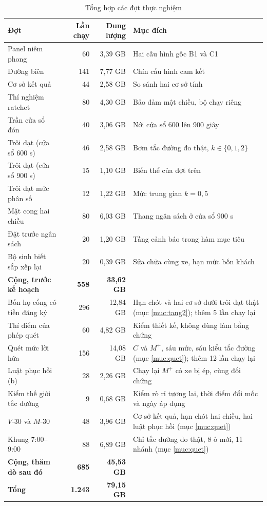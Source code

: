 \begin{table}[htbp]
\centering
\caption{Tổng hợp các đợt thực nghiệm}
\label{bang:quymo}
\small
\begin{tabular}{@{}lrrp{5.6cm}@{}}
\toprule
\textbf{Đợt} & \textbf{Lần chạy} & \textbf{Dung lượng} & \textbf{Mục đích}\\
\midrule
Panel niêm phong & 60 & 3{,}39 GB & Hai cấu hình gốc B1 và C1\\
Đường biên & 141 & 7{,}77 GB & Chín cấu hình cam kết\\
Cơ sở kết quả & 44 & 2{,}58 GB & So sánh hai cơ sở tính\\
Thí nghiệm ratchet & 80 & 4{,}30 GB & Bảo đảm một chiều, bộ chạy riêng\\
Trần cửa sổ đón & 40 & 3{,}06 GB & Nới cửa sổ 600 lên 900 giây\\
Trôi dạt (cửa sổ 600 s) & 46 & 2{,}58 GB & Bơm tắc đường đo thật, $k \in \{0,1,2\}$\\
Trôi dạt (cửa sổ 900 s) & 15 & 1{,}10 GB & Biến thể của đợt trên\\
Trôi dạt mức phân số & 12 & 1{,}22 GB & Mức trung gian $k = 0{,}5$\\
Mặt cong hai chiều & 80 & 6{,}03 GB & Thang ngân sách ở cửa sổ 900 s\\
Đặt trước ngân sách & 20 & 1{,}20 GB & Tầng cảnh báo trong hàm mục tiêu\\
Bộ sinh biết sắp xếp lại & 20 & 0{,}39 GB & Sửa chữa cùng xe, hạn mức bốn khách\\
\midrule
\textbf{Cộng, trước kế hoạch} & \textbf{558} & \textbf{33{,}62 GB} & \\
\midrule
Bốn họ cổng có tiền đăng ký & 296 & 12{,}84 GB & Hạn chót và hai cơ sở dưới trôi dạt thật (mục \ref{muc:tang2}); thêm 5 lần chạy lại\\
Thí điểm của phép quét & 60 & 4{,}82 GB & Kiểm thiết kế, không dùng làm bằng chứng\\
Quét mức lời hứa & 156 & 14{,}08 GB & $C$ và $M^{+}$, sáu mức, sáu kiểu tắc đường (mục \ref{muc:quet}); thêm 12 lần chạy lại\\
Luật phục hồi (b) & 28 & 2{,}26 GB & Chạy lại $M^{+}$ có xe bị ép, cùng đối chứng\\
Kiểm thế giới tắc đường & 9 & 0{,}68 GB & Kiểm rò rỉ tương lai, thời điểm đổi mốc và ngày áp dụng\\
$V$-30 và $M$-30 & 48 & 3{,}96 GB & Cơ sở kết quả, hạn chót hai chiều, hai luật phục hồi (mục \ref{muc:quet})\\
Khung 7:00--9:00 & 88 & 6{,}89 GB & Chỉ tắc đường đo thật, 8 ô mới, 11 nhánh (mục \ref{muc:quet})\\
\midrule
\textbf{Cộng, thăm dò sau đó} & \textbf{685} & \textbf{45{,}53 GB} & \\
\midrule
\textbf{Tổng} & \textbf{1.243} & \textbf{79{,}15 GB} & \\
\bottomrule
\end{tabular}
\end{table}

